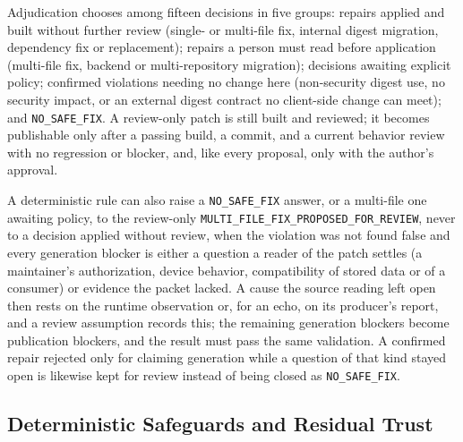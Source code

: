 \documentclass[conference]{IEEEtran}
\begin{document}
Adjudication chooses among fifteen decisions in five groups: repairs applied
and built without further review (single- or multi-file fix, internal digest
migration, dependency fix or replacement); repairs a person must read before
application (multi-file fix, backend or multi-repository migration); decisions
awaiting explicit policy; confirmed violations needing no change here
(non-security digest use, no security impact, or an external digest contract
no client-side change can meet); and \texttt{NO\_SAFE\_FIX}. A review-only patch
is still built and reviewed; it becomes publishable only after a passing build,
a commit, and a current behavior review with no regression or blocker, and,
like every proposal, only with the author's approval.

A deterministic rule can also raise a \texttt{NO\_SAFE\_FIX} answer, or a
multi-file one awaiting policy, to the review-only
\texttt{MULTI\_FILE\_FIX\_}\allowbreak\texttt{PROPOSED\_FOR\_REVIEW}, never to a
decision applied without review, when the violation was not found false and
every generation blocker is either a question a reader of the patch settles (a
maintainer's authorization, device behavior, compatibility of stored data or
of a consumer) or evidence the packet lacked. A cause the source reading left
open then rests on the runtime observation or, for an echo, on its producer's
report, and a review assumption records this; the remaining generation
blockers become publication blockers, and the result must pass the same
validation. A confirmed repair rejected only for claiming generation while a
question of that kind stayed open is likewise kept for review instead of being
closed as \texttt{NO\_SAFE\_FIX}.

\subsection{Deterministic Safeguards and Residual Trust}
\end{document}
